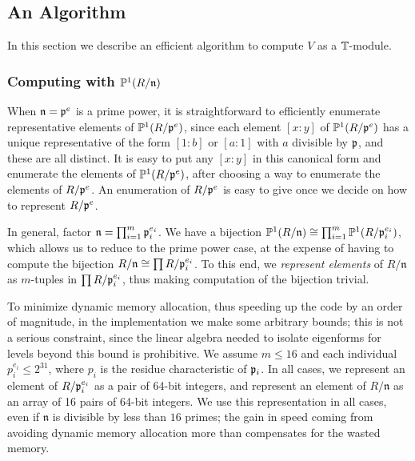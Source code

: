 \documentclass{amsart}
\newcommand{\n}{\mathfrak{n}}
\begin{document}
\subsection{An Algorithm}

In this section we describe an efficient algorithm to compute $V$ as
a $\mathbb{T}$-module.

\subsubsection{Computing with $\P^1(R/\n)$}
When $\n=\p^e$ is a prime power, it is
straightforward to efficiently enumerate representative elements of
$\mathbb{P}^1(R/\mathfrak{p}^e)$, since each element $[x:y]$ of $\mathbb{P}^1(R/\mathfrak{p}^e)$ has a
unique representative of the form $[1:b]$ or $[a:1]$ with $a$
divisible by $\mathfrak{p}$, and these are all distinct.  It is easy 
to put  any $[x:y]$ 
in this canonical form and enumerate the elements of $\mathbb{P}^1(R/\mathfrak{p}^e)$, after
choosing a way to enumerate the elements of $R/\mathfrak{p}^e$.
An enumeration of $R/\mathfrak{p}^e$ is easy to give
once we decide on how to represent $R/\mathfrak{p}^e$.

In general, factor $\n = \prod_{i=1}^m \p_i^{e_i}$. 
We have a bijection $\P^1(R/\n) \isom \prod_{i=1}^m
\P^1(R/\p_i^{e_i})$, which allows us to reduce to the prime power
case, at the expense of having to compute the bijection 
$R/\n \isom \prod R/\p_i^{e_i}$.
To this end, we {\em represent elements} of $R/\n$ as
$m$-tuples in $\prod R/\mathfrak{p}_i^{e_i}$, thus making
computation of the bijection trivial.  

To minimize dynamic memory allocation, thus speeding up the
code by an order of magnitude, in the implementation
we make some arbitrary
bounds; this is not a serious constraint, since the linear algebra
needed to isolate eigenforms for levels beyond this bound is
prohibitive. We assume $m\leq 16$ and each individual 
$p_i^{e_i}\leq 2^{31}$, where $p_i$ is the residue characteristic of $\mathfrak{p}_i$.  
In all cases, we represent an
element of $R/\mathfrak{p}_i^{e_i}$ as a pair of  64-bit integers, and
represent an element of $R/\n$ as an array of 16 pairs of 64-bit
integers. We use this representation in all cases, even if $\n$ is
divisible by less than $16$ primes; the gain in speed coming
from avoiding dynamic memory allocation more than compensates for the
wasted memory.
\end{document}
